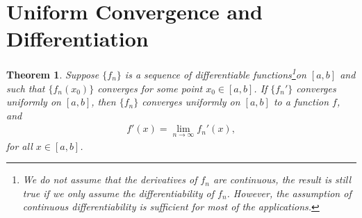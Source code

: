 \documentclass[11pt]{book}
\newtheorem{theorem}{Theorem}[chapter]
\theoremstyle{definition}
\numberwithin{equation}{chapter}
\begin{document}
\medskip



\section{Uniform Convergence and Differentiation}

\begin{theorem}\label{th_610}
Suppose $\{f_n\}$ is a sequence of differentiable functions\footnote{We do not assume that the derivatives of $f_n$ are continuous, the result is still true if we only assume the differentiability of $f_n$. However, the assumption of continuous differentiability is sufficient for most of the applications.}on $[a,b]$ and such that $\{f_n(x_0)\}$ converges for some point $x_0 \in [a,b]$. If $\{f_n'\}$ converges uniformly on $[a,b]$, then $\{f_n\}$ converges uniformly on $[a,b]$ to a function $f$, and 
\begin{align*}
    f'(x) = \lim_{n\to\infty} f_n'(x),
\end{align*}
for all $x \in [a,b]$.
\end{theorem}
\end{document}
